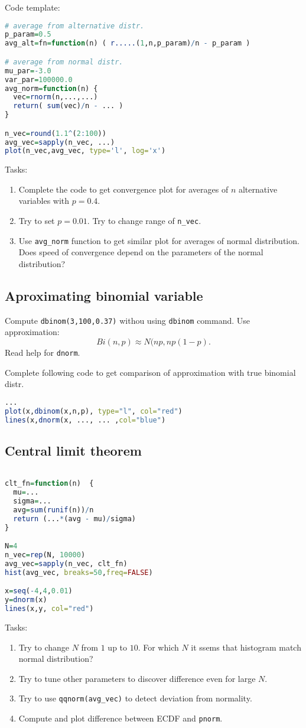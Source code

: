 \documentclass[4pt]{article}
\begin{document}
Code template:
\begin{lstlisting}[language=r]
# average from alternative distr.
p_param=0.5
avg_alt=fn=function(n) ( r.....(1,n,p_param)/n - p_param )

# average from normal distr.
mu_par=-3.0
var_par=100000.0
avg_norm=function(n) {
  vec=rnorm(n,...,...)
  return( sum(vec)/n - ... )
} 

n_vec=round(1.1^(2:100))
avg_vec=sapply(n_vec, ...)
plot(n_vec,avg_vec, type='l', log='x')
\end{lstlisting}

Tasks:
\begin{enumerate}
 \item Complete the code to get convergence plot for averages of $n$ alternative variables with $p=0.4$.
 \item Try to set $p=0.01$. Try to change range of \verb'n_vec'.
 \item Use \verb'avg_norm' function to get similar plot for averages of normal distribution. Does speed of convergence depend on the parameters of the normal distribution?
\end{enumerate}

\subsection{Aproximating binomial variable}
Compute \verb'dbinom(3,100,0.37)' withou using \verb'dbinom' command. Use approximation:
\[
   Bi(n,p) \approx N(np,np(1-p).
\]
Read help for \verb'dnorm'.

Complete following code to get comparison of approximation with true binomial distr.
\begin{lstlisting}[language=r]
...
plot(x,dbinom(x,n,p), type="l", col="red")
lines(x,dnorm(x, ..., ... ,col="blue")
\end{lstlisting}



\subsection{Central limit theorem}
\begin{lstlisting}[language=r]

clt_fn=function(n)  {
  mu=...
  sigma=...
  avg=sum(runif(n))/n
  return (...*(avg - mu)/sigma)
}  

N=4
n_vec=rep(N, 10000)
avg_vec=sapply(n_vec, clt_fn)
hist(avg_vec, breaks=50,freq=FALSE)

x=seq(-4,4,0.01)
y=dnorm(x)
lines(x,y, col="red")
\end{lstlisting}
Tasks:
\begin{enumerate}
 \item Try to change $N$ from $1$ up to $10$. For which $N$ it ssems that histogram match normal distribution?
 \item Try to tune other parameters to discover difference even for large $N$.
 \item Try to use \verb'qqnorm(avg_vec)' to detect deviation from normality.
 \item Compute and plot difference between ECDF and \verb'pnorm'.
\end{enumerate}
\end{document}
